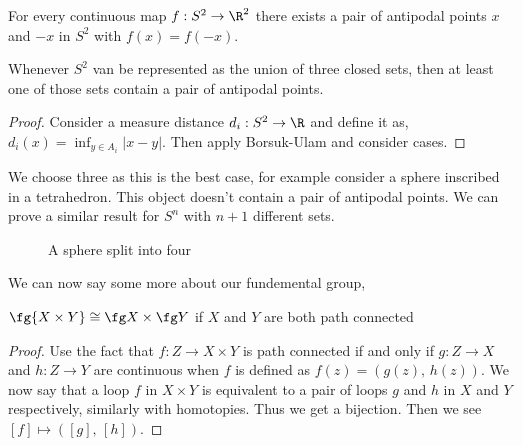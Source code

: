 \begin{nthm}
  For every continuous map $f : S^2 \to \R^2$ there exists a pair of antipodal points $x$ and $-x$ in $S^2$ with $f(x) = f(-x)$.
\end{nthm}

\begin{ncor}
  Whenever $S^2$ van be represented as the union of three closed sets, then at least one of those sets contain a pair of antipodal points.
\end{ncor}
\begin{proof}
  Consider a measure distance $d_i : S^2 \to \R$ and define it as, $d_i(x) = \inf_{y \in A_i} \left | x - y\right|$. Then apply Borsuk-Ulam and consider cases.
\end{proof}

We choose three as this is the best case, for example consider a sphere inscribed in a tetrahedron. This object doesn't contain a pair of antipodal points. We can prove a similar result for $S^n$ with $n+1$ different sets.

\begin{figure}[!ht]
\centering
{}
\caption{A sphere split into four}
\end{figure}

We can now say some more about our fundemental group,
\begin{nprop}
  $\fg {X \times Y} \cong \fg X \times \fg Y$ if $X$ and $Y$ are both path connected
\end{nprop}
\begin{proof}
  Use the fact that $f : Z \to X\times Y$ is path connected if and only if $g : Z \to X$ and $h : Z \to Y$ are continuous when $f$ is defined as $f(z) = (g(z),\, h(z))$. We now say that a loop $f$ in $X \times Y$ is equivalent to a pair of loops $g$ and $h$ in $X$ and $Y$ respectively, similarly with homotopies. Thus we get a bijection. Then we see $[f] \mapsto ([g],\, [h])$.
\end{proof}

